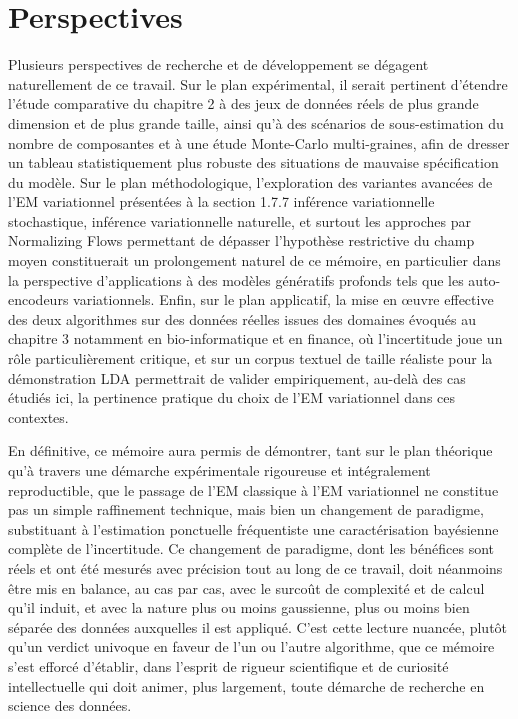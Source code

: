 \section*{Perspectives}
Plusieurs perspectives de recherche et de développement se dégagent naturellement de ce travail. Sur le plan expérimental, il serait pertinent d'étendre l'étude comparative du chapitre 2 à des jeux de données réels de plus grande dimension et de plus grande taille, ainsi qu'à des scénarios de sous-estimation du nombre de composantes et à une étude Monte-Carlo multi-graines, afin de dresser un tableau statistiquement plus robuste des situations de mauvaise spécification du modèle. Sur le plan méthodologique, l'exploration des variantes avancées de l'EM variationnel présentées à la section 1.7.7  inférence variationnelle stochastique, inférence variationnelle naturelle, et surtout les approches par Normalizing Flows permettant de dépasser l'hypothèse restrictive du champ moyen  constituerait un prolongement naturel de ce mémoire, en particulier dans la perspective d'applications à des modèles génératifs profonds tels que les auto-encodeurs variationnels. Enfin, sur le plan applicatif, la mise en œuvre effective des deux algorithmes sur des données réelles issues des domaines évoqués au chapitre 3  notamment en bio-informatique et en finance, où l'incertitude joue un rôle particulièrement critique, et sur un corpus textuel de taille réaliste pour la démonstration LDA  permettrait de valider empiriquement, au-delà des cas étudiés ici, la pertinence pratique du choix de l'EM variationnel dans ces contextes.

En définitive, ce mémoire aura permis de démontrer, tant sur le plan théorique qu'à travers une démarche expérimentale rigoureuse et intégralement reproductible, que le passage de l'EM classique à l'EM variationnel ne constitue pas un simple raffinement technique, mais bien un changement de paradigme, substituant à l'estimation ponctuelle fréquentiste une caractérisation bayésienne complète de l'incertitude. Ce changement de paradigme, dont les bénéfices sont réels et ont été mesurés avec précision tout au long de ce travail, doit néanmoins être mis en balance, au cas par cas, avec le surcoût de complexité et de calcul qu'il induit, et avec la nature  plus ou moins gaussienne, plus ou moins bien séparée  des données auxquelles il est appliqué. C'est cette lecture nuancée, plutôt qu'un verdict univoque en faveur de l'un ou l'autre algorithme, que ce mémoire s'est efforcé d'établir, dans l'esprit de rigueur scientifique et de curiosité intellectuelle qui doit animer, plus largement, toute démarche de recherche en science des données.


